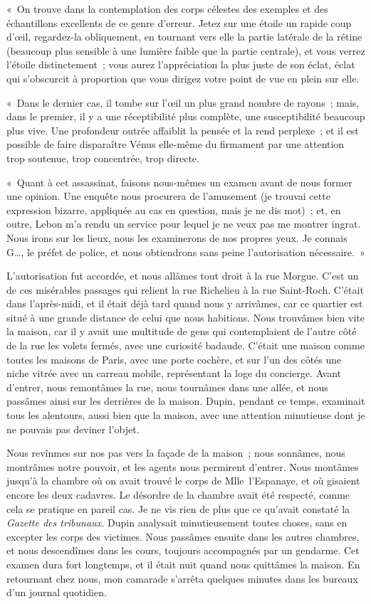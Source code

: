\documentclass[french,twoside]{book} %
\begin{document}
« On trouve dans la contemplation des corps célestes des exemples et des échantillons excellents de ce genre d’erreur. Jetez sur une étoile un rapide coup d’œil, regardez-la obliquement, en tournant vers elle la partie latérale de la rétine (beaucoup plus sensible à une lumière faible que la partie centrale), et vous verrez l’étoile distinctement ; vous aurez l’appréciation la plus juste de son éclat, éclat qui s’obscurcit à proportion que vous dirigez votre point de vue en plein sur elle.\par
« Dans le dernier cas, il tombe sur l’œil un plus grand nombre de rayons ; mais, dans le premier, il y a une réceptibilité plus complète, une susceptibilité beaucoup plus vive. Une profondeur outrée affaiblit la pensée et la rend perplexe ; et il est possible de faire disparaître Vénus elle-même du firmament par une attention trop soutenue, trop concentrée, trop directe.\par
« Quant à cet assassinat, faisons nous-mêmes un examen avant de nous former une opinion. Une enquête nous procurera de l’amusement (je trouvai cette expression bizarre, appliquée au cas en question, mais je ne dis mot) ; et, en outre, Lebon m’a rendu un service pour lequel je ne veux pas me montrer ingrat. Nous irons sur les lieux, nous les examinerons de nos propres yeux. Je connais G…, le préfet de police, et nous obtiendrons sans peine l’autorisation nécessaire. »\par
L’autorisation fut accordée, et nous allâmes tout droit à la rue Morgue. C’est un de ces misérables passages qui relient la rue Richelieu à la rue Saint-Roch. C’était dans l’après-midi, et il était déjà tard quand nous y arrivâmes, car ce quartier est situé à une grande distance de celui que nous habitions. Nous trouvâmes bien vite la maison, car il y avait une multitude de gens qui contemplaient de l’autre côté de la rue les volets fermés, avec une curiosité badaude. C’était une maison comme toutes les maisons de Paris, avec une porte cochère, et sur l’un des côtés une niche vitrée avec un carreau mobile, représentant la loge du concierge. Avant d’entrer, nous remontâmes la rue, nous tournâmes dans une allée, et nous passâmes ainsi sur les derrières de la maison. Dupin, pendant ce temps, examinait tous les alentours, aussi bien que la maison, avec une attention minutieuse dont je ne pouvais pas deviner l’objet.\par
Nous revînmes sur nos pas vers la façade de la maison ; nous sonnâmes, nous montrâmes notre pouvoir, et les agents nous permirent d’entrer. Nous montâmes jusqu’à la chambre où on avait trouvé le corps de Mlle l’Espanaye, et où gisaient encore les deux cadavres. Le désordre de la chambre avait été respecté, comme cela se pratique en pareil cas. Je ne vis rien de plus que ce qu’avait constaté la \emph{Gazette des tribunaux.} Dupin analysait minutieusement toutes choses, sans en excepter les corps des victimes. Nous passâmes ensuite dans les autres chambres, et nous descendîmes dans les cours, toujours accompagnés par un gendarme. Cet examen dura fort longtemps, et il était nuit quand nous quittâmes la maison. En retournant chez nous, mon camarade s’arrêta quelques minutes dans les bureaux d’un journal quotidien.\par
\end{document}
